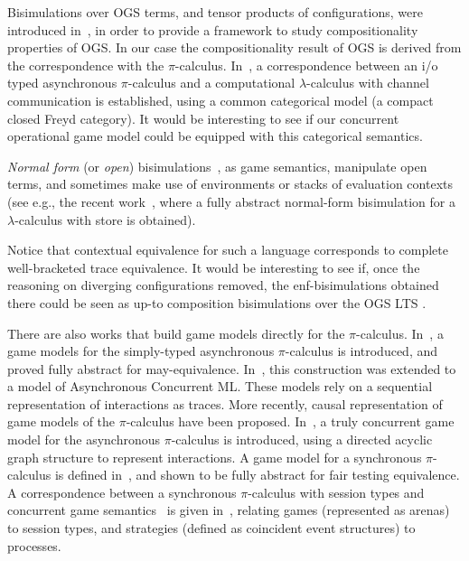 Bisimulations over  OGS terms, and tensor products of configurations,
were introduced in~\cite{10.1145/2603088.2603150},
in order to provide a framework to study compositionality properties of OGS.
In our case the compositionality result of OGS is derived from the correspondence with the
$\pi$-calculus.
In~\cite{sakayori2019categorical}, a correspondence between an i/o typed asynchronous $\pi$-calculus 
and a computational $\lambda$-calculus with channel communication is established, 
using a common categorical model (a compact closed Freyd category).
It would be interesting to see if our concurrent operational game model could be equipped with this categorical semantics.

\emph{Normal form} (or \emph{open}) bisimulations~\cite{lassentrees,Stovring-Lassen},
as game
semantics, 
manipulate open terms, and sometimes make use of
environments or stacks of evaluation contexts (see e.g., the recent
work~\cite{biernacki2019complete}, where  a fully abstract  normal-form 
bisimulation for a $\lambda$-calculus with store is obtained).  

Notice that contextual equivalence for such a language corresponds to complete well-bracketed 
trace equivalence.
It would be interesting to see if, once the reasoning on diverging configurations removed,
the enf-bisimulations obtained there could be seen as up-to composition bisimulations
over the OGS LTS .

There are also works that build
game models directly for the $\pi$-calculus.
In~\cite{laird2005game}, a game models for the simply-typed asynchronous $\pi$-calculus 
is introduced, and proved fully abstract for may-equivalence.
In~\cite{10.1007/11944836_38}, this construction was extended to a model of Asynchronous Concurrent ML.
These models rely on a sequential representation of interactions as traces.
More recently, causal representation of game models of the $\pi$-calculus have been proposed.
In~\cite{sakayori2017truly}, a truly concurrent game model for the asynchronous $\pi$-calculus is introduced,
using a directed acyclic graph structure to represent interactions.
%
A game model for a synchronous $\pi$-calculus is defined in~\cite{eberhart2015intensionally}, and shown to
be fully abstract for fair testing equivalence. 
A correspondence between a synchronous $\pi$-calculus with session types and 
concurrent game semantics~\cite{winskel2017games}
is given in~\cite{10.1145/3290340}, relating 
games (represented as arenas) to  session types, and 
strategies (defined as coincident event structures) to processes.


